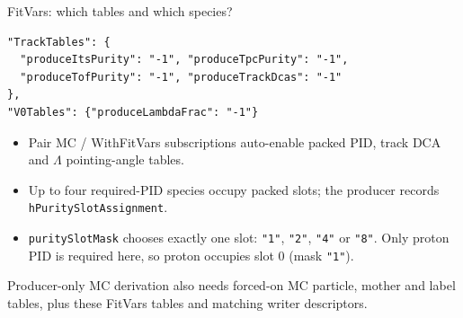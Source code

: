 \begin{frame}[fragile]{FitVars: which tables and which species?}
 \begin{lstlisting}
"TrackTables": {
  "produceItsPurity": "-1", "produceTpcPurity": "-1",
  "produceTofPurity": "-1", "produceTrackDcas": "-1"
},
"V0Tables": {"produceLambdaFrac": "-1"}
 \end{lstlisting}
 \begin{itemize}
 \item Pair MC / WithFitVars subscriptions auto-enable packed PID, track DCA and $\Lambda$ pointing-angle tables.
 \item Up to four required-PID species occupy packed slots; the producer records \texttt{hPuritySlotAssignment}.
 \item \texttt{puritySlotMask} chooses exactly one slot: \texttt{"1"}, \texttt{"2"}, \texttt{"4"} or \texttt{"8"}. Only proton PID is required here, so proton occupies slot 0 (mask \texttt{"1"}).
 \end{itemize}
 \small Producer-only MC derivation also needs forced-on MC particle, mother and label tables, plus these FitVars tables and matching writer descriptors.
\end{frame}

